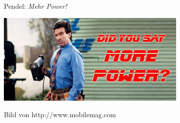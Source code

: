 \begin{frame}{Pendel: \emph{Mehr Power!}}

  \begin{center}
    \includegraphics[width=0.7\textwidth]{Figures/power.jpg}
  \end{center}
  \vspace{4ex}\scriptsize{Bild von http://www.mobilemag.com}
\end{frame}



